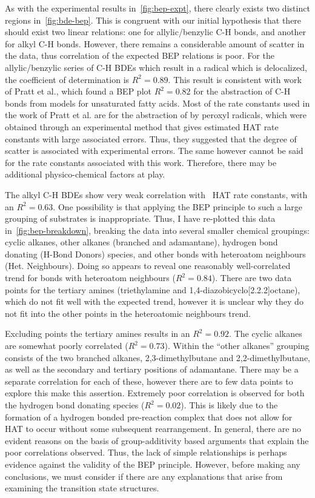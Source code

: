 As with the experimental results in~\ref{fig:bep-expt}, there clearly exists two distinct regions in~\ref{fig:bde-bep}. This is congruent with our initial hypothesis that there should exist two linear relations: one for allylic/benzylic C-H bonds, and another for alkyl C-H bonds. However, there remains a considerable amount of scatter in the data, thus correlation of the expected BEP relations is poor. For the allylic/benzylic series of C-H BDEs which result in a radical which is delocalized, the coefficient of determination is $R^2 = 0.89$. This result is consistent with work of Pratt et al.\cite{Pratt2003}, which found a BEP plot $R^2 =0.82$ for the abstraction of C-H bonds from models for unsaturated fatty acids. Most of the rate constants used in the work of Pratt et al. are for the abstraction of  by peroxyl radicals, which were obtained through an experimental method that gives estimated HAT rate constants with large associated errors. Thus, they suggested that the degree of scatter is associated with experimental errors. The same however cannot be said for the rate constants associated with this work. Therefore, there may be additional physico-chemical factors at play.

The alkyl C-H BDEs show very weak correlation with \cumo\ HAT rate constants, with an $R^2 =0.63$. One possibility is that applying the BEP principle to such a large grouping of substrates is inappropriate. Thus, I have re-plotted this data in~\ref{fig:bep-breakdown}, breaking the data into several smaller chemical groupings: cyclic alkanes, other alkanes (branched and adamantane), hydrogen bond donating (H-Bond Donors) species, and other  bonds with heteroatom neighbours (Het. Neighbours). Doing so appears to reveal one reasonably well-correlated trend for  bonds with heteroatom neighbours ($R^2 = 0.84$). There are two data points for the tertiary amines (triethylamine and 1,4-diazobicyclo[2.2.2]octane), which do not fit well with the expected trend, however it is unclear why they do not fit into the other points in the heteroatomic neighbours trend.

Excluding points the tertiary amines results in an $R^2 = 0.92$.
The cyclic alkanes are somewhat poorly correlated ($R^2 = 0.73$). Within the ``other alkanes'' grouping consists of the two branched alkanes, 2,3-dimethylbutane and 2,2-dimethylbutane, as well as the secondary and tertiary  positions of adamantane. There may be a separate correlation for each of these, however there are to few data points to explore this make this assertion. Extremely poor correlation is observed for both the hydrogen bond donating species ($R^2 = 0.02$). This is likely due to the formation of a hydrogen bonded pre-reaction complex that does not allow for HAT to occur without some subsequent rearrangement. In general, there are no evident reasons on the basis of group-additivity based arguments that explain the poor correlations observed. Thus, the lack of simple relationships is perhaps evidence against the validity of the BEP principle. However, before making any conclusions, we must consider if there are any explanations that arise from examining the transition state structures.

